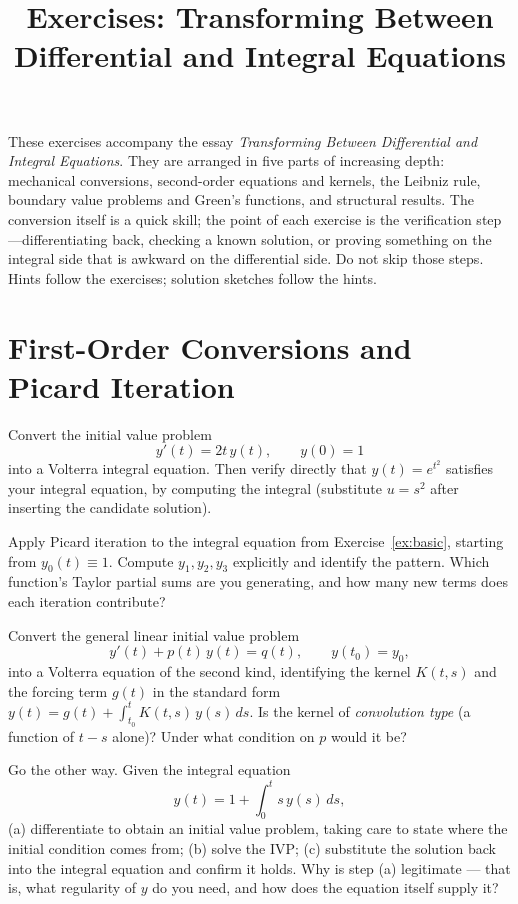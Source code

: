 \documentclass{essay}
\title{Exercises: Transforming Between Differential and Integral Equations}
\author{}
\date{}
\begin{document}
\maketitle

These exercises accompany the essay \emph{Transforming Between Differential and Integral Equations}. They are arranged in five parts of increasing depth: mechanical conversions, second-order equations and kernels, the Leibniz rule, boundary value problems and Green's functions, and structural results. The conversion itself is a quick skill; the point of each exercise is the verification step---differentiating back, checking a known solution, or proving something on the integral side that is awkward on the differential side. Do not skip those steps. Hints follow the exercises; solution sketches follow the hints.

\section{First-Order Conversions and Picard Iteration}

\begin{exercise}\label{ex:basic}
Convert the initial value problem
\[
y'(t) = 2t\,y(t), \qquad y(0) = 1
\]
into a Volterra integral equation. Then verify directly that $y(t) = e^{t^2}$ satisfies your integral equation, by computing the integral (substitute $u = s^2$ after inserting the candidate solution).
\end{exercise}

\begin{exercise}\label{ex:picard}
Apply Picard iteration to the integral equation from Exercise~\ref{ex:basic}, starting from $y_0(t) \equiv 1$. Compute $y_1, y_2, y_3$ explicitly and identify the pattern. Which function's Taylor partial sums are you generating, and how many new terms does each iteration contribute?
\end{exercise}

\begin{exercise}\label{ex:linear}
Convert the general linear initial value problem
\[
y'(t) + p(t)\,y(t) = q(t), \qquad y(t_0) = y_0,
\]
into a Volterra equation of the second kind, identifying the kernel $K(t,s)$ and the forcing term $g(t)$ in the standard form $y(t) = g(t) + \int_{t_0}^{t} K(t,s)\,y(s)\,ds$. Is the kernel of \emph{convolution type} (a function of $t - s$ alone)? Under what condition on $p$ would it be?
\end{exercise}

\begin{exercise}\label{ex:backward}
Go the other way. Given the integral equation
\[
y(t) = 1 + \int_0^t s\,y(s)\,ds,
\]
(a) differentiate to obtain an initial value problem, taking care to state where the initial condition comes from; (b) solve the IVP; (c) substitute the solution back into the integral equation and confirm it holds. Why is step (a) legitimate --- that is, what regularity of $y$ do you need, and how does the equation itself supply it?
\end{exercise}
\end{document}
